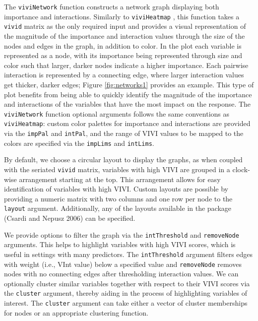 The \texttt{viviNetwork} function constructs a network graph displaying both importance and interactions.
Similarly to \texttt{viviHeatmap} , this function takes a \texttt{vivid} matrix as the only required input and provides a visual representation of the magnitude of the importance and interaction values through the size of the nodes and edges in the graph, in addition to color. In the plot each variable is represented as a node, with its importance being represented through size and color such that larger, darker nodes indicate a higher importance. Each pairwise interaction is represented by a connecting edge, where larger interaction values get thicker, darker edges; Figure \ref{fig:networks1} provides an example. This type of plot benefits from being able to quickly identify the magnitude of the importance and interactions of the variables that have the most impact on the response. The \texttt{viviNetwork} function optional arguments follows the same conventions as \texttt{viviHeatmap}: custom color palettes for importance and interactions are provided via the \texttt{impPal} and \texttt{intPal}, and the range of VIVI values to be mapped to the colors are specified via the \texttt{impLims} and \texttt{intLims}.

By default, we choose a circular layout to display the graphs, as when coupled with the seriated \texttt{vivid} matrix, variables with high VIVI are grouped in a clock-wise arrangement starting at the top. This arrangement allows for easy identification of variables with high VIVI. Custom layouts are possible by providing a numeric matrix with two columns and one row per node to the \texttt{layout} argument. Additionally, any of the layouts available in the  package (Csardi and Nepusz 2006) can be specified.

We provide options to filter the graph via the \texttt{intThreshold} and \texttt{removeNode} arguments. This helps to highlight variables with high VIVI scores, which is useful in settings with many predictors. The \texttt{intThreshold} argument filters edges with weight (i.e., VInt value) below a specified value and \texttt{removeNode} removes nodes with no connecting edges after thresholding interaction values. We can optionally cluster similar variables together with respect to their VIVI scores via the \texttt{cluster} argument, thereby aiding in the process of highlighting variables of interest. The \texttt{cluster} argument can take either a vector of cluster memberships for nodes or an appropriate  clustering function.

